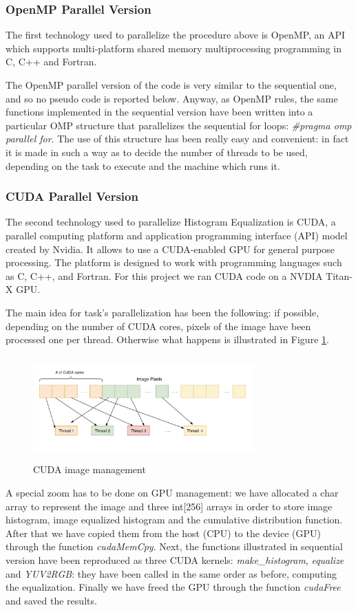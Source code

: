 \documentclass[10pt,twocolumn,letterpaper]{article}
\begin{document}
\subsubsection{OpenMP Parallel Version}
The first technology used to parallelize the procedure above is OpenMP, an API which supports multi-platform shared memory multiprocessing programming in C, C++ and Fortran. 

The OpenMP parallel version of the code is very similar to the sequential one, and so no pseudo code is reported below. Anyway, as OpenMP rules, the same functions implemented in the sequential version have been written into a particular OMP structure that parallelizes the sequential for loops: \textit{\#pragma omp parallel for}. The use of this structure has been really easy and convenient: in fact it is made in such a way as to decide the number of threads to be used, depending on the task to execute and the machine which runs it.

\subsubsection{CUDA Parallel Version}
The second technology used to parallelize Histogram Equalization is CUDA, a parallel computing platform and application programming interface (API) model created by Nvidia. It allows to use a CUDA-enabled GPU for general purpose processing. The platform is designed to work with programming languages such as C, C++, and Fortran. For this project we ran CUDA code on a NVDIA Titan-X GPU.

The main idea for task's parallelization has been the following: if possible, depending on the number of CUDA cores, pixels of the image have been processed one per thread. Otherwise what happens is illustrated in Figure \ref{fig:shared}.

\begin{figure}[h]
	\centering
	\includegraphics[width=8.5cm, height=4cm]{shared}
	\caption{CUDA image management}
	\label{fig:shared}
\end{figure}

A special zoom has to be done on GPU management: we have allocated a char array to represent the image and three int[256] arrays in order to store image histogram, image equalized histogram and the cumulative distribution function. After that we have copied them from the host (CPU) to the device (GPU) through the function \textit{cudaMemCpy}. Next, the functions illustrated in sequential version have been reproduced as three CUDA kernels: \textit{make\_histogram}, \textit{equalize} and \textit{YUV2RGB}: they have been called in the same order as before, computing the equalization. Finally we have freed the GPU through the function \textit{cudaFree} and saved the results.
\end{document}
